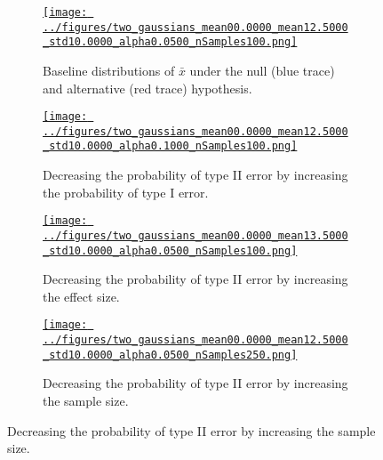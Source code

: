 \documentclass[12pt]{article}
\begin{document}
\begin{enumerate}[(a)]
        \begin{figure}[H]
            \begin{center}
                \begin{subfigure}{0.4\textwidth}
                    \centering
                    \href{https://www.gatsby.ucl.ac.uk/~rapela/neuroinformatics/2023/ws1/figures/two_gaussians_mean00.0000_mean12.5000_std10.0000_alpha0.0500_nSamples100.html}{\texttt{[image: ../figures/two\_gaussians\_mean00.0000\_mean12.5000\_std10.0000\_alpha0.0500\_nSamples100.png]}}
                    \caption{Baseline distributions of $\bar{x}$ under the null
                    (blue trace) and alternative (red trace) hypothesis.}
                    \label{fig:ex1b_intro_a}
                \end{subfigure}
                \hfill
                \begin{subfigure}{0.4\textwidth}
                    \centering
                    \href{https://www.gatsby.ucl.ac.uk/~rapela/neuroinformatics/2023/ws1/figures/two_gaussians_mean00.0000_mean12.5000_std10.0000_alpha0.1000_nSamples100.html}{\texttt{[image: ../figures/two\_gaussians\_mean00.0000\_mean12.5000\_std10.0000\_alpha0.1000\_nSamples100.png]}}
                    \caption{Decreasing the probability of type II error by
                    increasing the probability of type I error.}
                    \label{fig:ex1b_intro_b}
                \end{subfigure}
                \hfill
                \begin{subfigure}{0.4\textwidth}
                    \centering
                    \href{https://www.gatsby.ucl.ac.uk/~rapela/neuroinformatics/2023/ws1/figures/two_gaussians_mean00.0000_mean13.5000_std10.0000_alpha0.0500_nSamples100.html}{\texttt{[image: ../figures/two\_gaussians\_mean00.0000\_mean13.5000\_std10.0000\_alpha0.0500\_nSamples100.png]}}
                    \caption{Decreasing the probability of type II error by
                    increasing the effect size.}
                    \label{fig:ex1b_intro_c}
                \end{subfigure}
                \hfill
                \begin{subfigure}{0.4\textwidth}
                    \centering
                    \href{https://www.gatsby.ucl.ac.uk/~rapela/neuroinformatics/2023/ws1/figures/two_gaussians_mean00.0000_mean12.5000_std10.0000_alpha0.0500_nSamples250.html}{\texttt{[image: ../figures/two\_gaussians\_mean00.0000\_mean12.5000\_std10.0000\_alpha0.0500\_nSamples250.png]}}
                    \caption{Decreasing the probability of type II error by
                    increasing the sample size.}
                    \label{fig:ex1b_intro_d}
                \end{subfigure}


\end{center}
\end{figure}
\end{enumerate}
\end{document}
